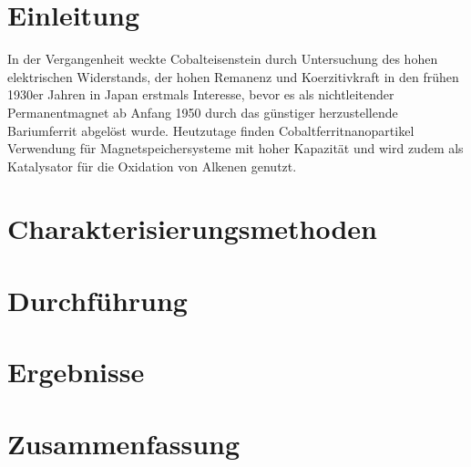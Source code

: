 \documentclass[a4paper,12pt,bibtotocnumbered]{scrartcl}
\begin{document}
\clearpage

\renewcommand{\thepage}{\arabic{page}}
\setcounter{page}{1}


\section{Einleitung}
In der Vergangenheit weckte Cobalteisenstein durch Untersuchung des hohen elektrischen Widerstands, der hohen Remanenz und Koerzitivkraft in den frühen 1930er Jahren in Japan erstmals Interesse, bevor es als nichtleitender Permanentmagnet ab Anfang 1950 durch das günstiger herzustellende Bariumferrit abgelöst wurde.
Heutzutage finden Cobaltferritnanopartikel Verwendung für Magnetspeichersysteme mit hoher Kapazität und  wird zudem als Katalysator für die Oxidation von Alkenen genutzt.



\section{Charakterisierungsmethoden}


\newpage

\section{Durchführung}


\section{Ergebnisse}



\section{Zusammenfassung}



\printbibliography[title={Literatur}]
\end{document}
